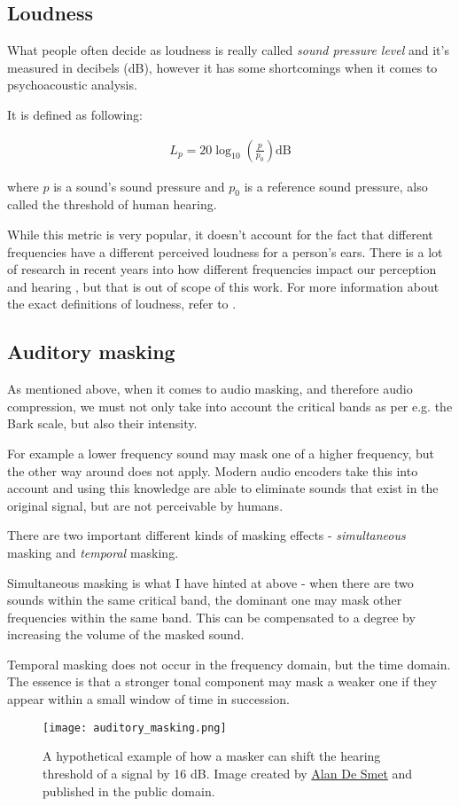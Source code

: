 \subsection{Loudness}
What people often decide as loudness is really called \emph{sound pressure level} and it's measured in decibels (dB), however it has some shortcomings when it comes to psychoacoustic analysis.

It is defined as following: \cite{behar_1984}

\begin{align}
L_p = 20 \log_{10} \left( \frac{p}{p_0} \right) \text{dB}
\end{align}

where $p$ is a sound's sound pressure and $p_0$ is a reference sound pressure, also called the threshold of human hearing.

While this metric is very popular, it doesn't account for the fact that different frequencies have a different perceived loudness for a person's ears. \cite{olson1967music} There is a lot of research in recent years into how different frequencies impact our perception and hearing \cite{kuwano_1989}, but that is out of scope of this work. For more information about the exact definitions of loudness, refer to \cite{olson1967music}.

\subsection{Auditory masking}
As mentioned above, when it comes to audio masking, and therefore audio compression, we must not only take into account the critical bands as per e.g. the Bark scale, but also their intensity.

For example a lower frequency sound may mask one of a higher frequency, but the other way around does not apply. \cite{gelfand1990hearing} Modern audio encoders take this into account and using this knowledge are able to eliminate sounds that exist in the original signal, but are not perceivable by humans.

There are two important different kinds of masking effects - \emph{simultaneous} masking and \emph{temporal} masking. \cite{Raissi2002TheTB}

Simultaneous masking is what I have hinted at above - when there are two sounds within the same critical band, the dominant one may mask other frequencies within the same band. This can be compensated to a degree by increasing the volume of the masked sound.

Temporal masking does not occur in the frequency domain, but the time domain. The essence is that a stronger tonal component may mask a weaker one if they appear within a small window of time in succession.

\begin{figure}[ht]
	\caption[Auditory masking]{A hypothetical example of how a masker can shift the hearing threshold of a signal by 16 dB. Image created by \href{http://www.highprogrammer.com/alan/}{Alan De Smet} and published in the public domain.}
	\centering
	\texttt{[image: auditory\_masking.png]}
\end{figure}
